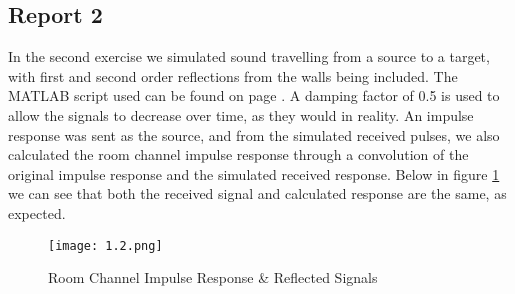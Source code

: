 \subsection*{Report 2}

	In the second exercise we simulated sound travelling from a source to a target, with first and second order reflections from the walls being included. The MATLAB script used can be found on page \pageref{matlab_1.2}. A damping factor of 0.5 is used to allow the signals to decrease over time, as they would in reality. An impulse response was sent as the source, and from the simulated received pulses, we also calculated the room channel impulse response through a convolution of the original impulse response and the simulated received response. Below in figure \ref{figure:1_2} we can see that both the received signal and calculated response are the same, as expected.
	
	\begin{figure}[H] 
		\centering
		\texttt{[image: 1.2.png]}
		\caption{Room Channel Impulse Response \& Reflected Signals}
		\label{figure:1_2}
	\end{figure}